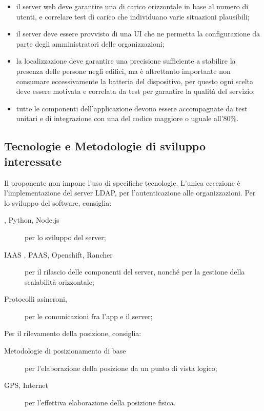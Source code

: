 \documentclass[../studio-di-fattibilita.tex]{subfiles}
\begin{document}
\begin{itemize}
    \item il server web deve garantire una  di carico orizzontale in base al numero di utenti, e correlare test di carico che individuano varie situazioni plausibili;
    \item il server deve essere provvisto di una UI che ne permetta la configurazione da parte degli amministratori delle organizzazioni;
    \item la localizzazione deve garantire una precisione sufficiente a stabilire la presenza delle persone negli edifici, ma è altrettanto importante non consumare eccessivamente la batteria del dispositivo, per questo ogni scelta deve essere motivata e correlata da test per garantire la qualità del servizio;
    \item tutte le componenti dell’applicazione devono essere accompagnate da test unitari e di integrazione con una  del codice maggiore o uguale all'80\%.
  \end{itemize}


  \subsection{Tecnologie e Metodologie di sviluppo interessate}%
  \label{subsec:tecnologie_interessate}
  Il proponente non impone l'uso di specifiche tecnologie. L'unica eccezione è l'implementazione del server LDAP, per l'autenticazione alle organizzazioni.
  Per lo sviluppo del software, consiglia:
  \begin{description}
    \item[, Python, Node.js] per lo sviluppo del server;
    \item[IAAS , PAAS, Openshift, Rancher] per il rilascio delle componenti del server, nonché per la gestione della scalabilità orizzontale;
    \item[Protocolli asincroni, ] per le comunicazioni fra l'app e il server;
  \end{description}

  Per il rilevamento della posizione, consiglia:
  \begin{description}
    \item[Metodologie di posizionamento di base] per l'elaborazione della posizione da un punto di vista logico;
    \item[GPS, Internet] per l'effettiva elaborazione della posizione fisica.
  \end{description}
\end{document}
